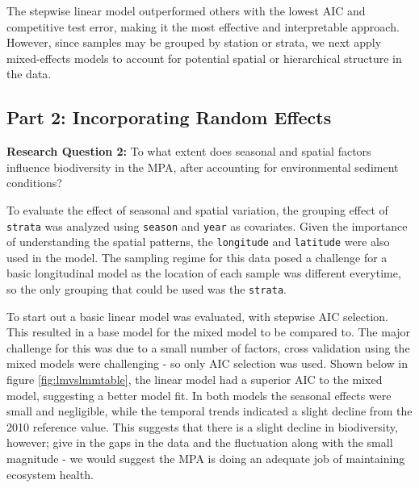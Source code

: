 \documentclass[12pt]{article}
\begin{document}
\qquad The stepwise linear model outperformed others with the lowest AIC and competitive test error, making it the most effective and interpretable approach. However, since samples may be grouped by station or strata, we next apply mixed-effects models to account for potential spatial or hierarchical structure in the data.

\subsection{Part 2: Incorporating Random Effects}

\textbf{Research Question 2: } To what extent does seasonal and spatial factors
influence biodiversity in the MPA, after accounting for environmental sediment
conditions?

To evaluate the effect of seasonal and spatial variation, the grouping effect of
\texttt{strata} was analyzed using  \texttt{season} and  \texttt{year} as
covariates. Given the importance  of understanding the spatial patterns, the
\texttt{longitude} and \texttt{latitude} were also used in the model. The
sampling regime for this data posed a challenge for a basic longitudinal model
as the location of each sample was different everytime, so the only grouping
that could be used was the \texttt{strata}.

To start out a basic linear model was evaluated, with stepwise AIC selection.
This resulted in a base model for the mixed model to be compared to. The major
challenge for this was due to a small number of factors, cross validation using
the mixed models were challenging - so only AIC selection was used. Shown below
in figure \ref{fig:lmvslmmtable}, the linear model had a superior AIC to the
mixed model, suggesting a better model fit. In both models the seasonal effects
were small and negligible, while the temporal trends indicated a slight decline
from the 2010 reference value. This suggests that there is a slight decline in
biodiversity, however; give in the gaps in the data and the fluctuation along
with the small magnitude - we would suggest the MPA is doing an adequate job of
maintaining ecosystem health.
\end{document}
